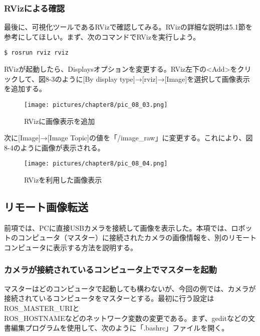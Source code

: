 \subsubsection{RVizによる確認}

最後に、可視化ツールであるRVizで確認してみる。RVizの詳細な説明は5.1節を参考にしてほしい。まず、次のコマンドでRVizを実行しよう。

\begin{lstlisting}[language=ROS]
$ rosrun rviz rviz
\end{lstlisting}

RVizが起動したら、Displaysオプションを変更する。RViz左下の<Add>をクリックして、図8-3のように[By display type]→[rviz]→[Image]を選択して画像表示を追加する。

\begin{figure}[htp]
  \centering
  \texttt{[image: pictures/chapter8/pic\_08\_03.png]}
  \caption{RVizに画像表示を追加}
\end{figure}

次に[Image]→[Image Topic]の値を「/image\_raw」に変更する。これにより、図8-4のように画像が表示される。

\begin{figure}[htp]
  \centering
  \texttt{[image: pictures/chapter8/pic\_08\_04.png]}
  \caption{RVizを利用した画像表示}
\end{figure}

\subsection{リモート画像転送}

前項では、PCに直接USBカメラを接続して画像を表示した。本項では、ロボットのコンピュータ（マスター）に接続されたカメラの画像情報を、別のリモートコンピュータに表示する方法を説明する。

\subsubsection{カメラが接続されているコンピュータ上でマスターを起動}

マスターはどのコンピュータで起動しても構わないが、今回の例では、カメラが接続されているコンピュータをマスターとする。最初に行う設定はROS\_MASTER\_URIと\\ROS\_HOSTNAMEなどのネットワーク変数の変更である。まず、geditなどの文書編集プログラムを使用して、次のように「.bashrc」ファイルを開く。

